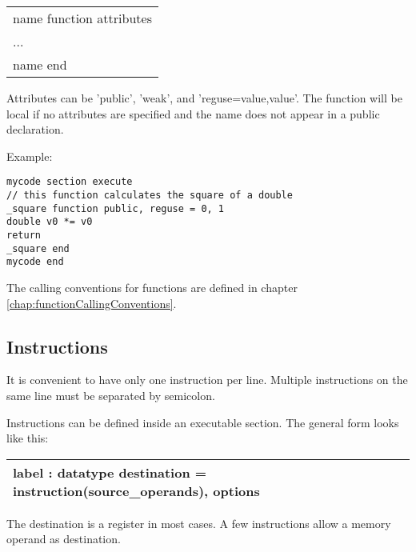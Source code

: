 \documentclass[forwardcom.tex]{subfiles}
\begin{document}
\begin{tabular}{|p{140mm}|}
\hline
\hspace{4mm} name function attributes\\
\hspace{4mm} ...\\
\hspace{4mm} name end\\
\hline
\end{tabular}
\vspace{4mm}

Attributes can be 'public', 'weak', and 'reguse=value,value'. 
The function will be local if no attributes are specified and 
the name does not appear in a public declaration.
\vspace{2mm}

Example:
\vspace{1mm}

\begin{lstlisting}[frame=single]
mycode section execute
// this function calculates the square of a double
_square function public, reguse = 0, 1
double v0 *= v0
return
_square end
mycode end
\end{lstlisting}
\vspace{2mm}

The calling conventions for functions are defined in chapter \ref{chap:functionCallingConventions}.
\vspace{2mm}


\subsection{Instructions} \label{assemblyInstructions}
It is convenient to have only one instruction per line. Multiple instructions on the same line must be separated by semicolon.
\vspace{2mm}

Instructions can be defined inside an executable section. The general form looks like this:

\begin{tabular}{|p{130mm}|}
\hline
\hspace{4mm} label : datatype destination = instruction(source\_operands), options \\
\hline
\end{tabular}
\vspace{4mm}

The destination is a register in most cases. A few instructions allow a memory operand as destination.
\end{document}
